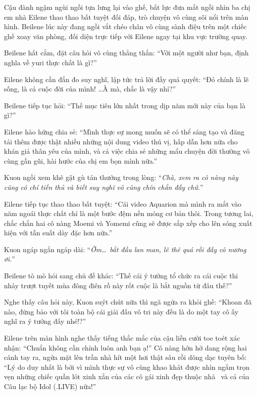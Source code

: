 \documentclass[../main.tex]{subfiles}
\begin{document}
Cậu đành ngậm ngùi ngồi tựa lưng lại vào ghế, bất lực đưa mắt ngồi nhìn ba chị em nhà Eilene thao thao bất tuyệt đối đáp, trò chuyện vô cùng sôi nổi trên màn hình. Beilene lúc này đang ngồi vắt chéo chân vô cùng sành điệu trên một chiếc ghế xoay văn phòng, đối diện trực tiếp với Eilene ngay tại khu vực trường quay.

Beilene hất cằm, đặt câu hỏi vô cùng thẳng thắn: ``Với một người như bạn, định nghĩa về yuri thực chất là gì?''

Eilene không cần đắn đo suy nghĩ, lập tức trả lời đầy quả quyết: ``Đó chính là lẽ sống, là cả cuộc đời của mình! \dots À mà, chắc là vậy nhỉ?''

Beilene tiếp tục hỏi: ``Thế mục tiêu lớn nhất trong dịp năm mới này của bạn là gì?''

Eilene hào hứng chia sẻ: ``Mình thực sự mong muốn sẽ có thể sáng tạo và đăng tải thêm được thật nhiều những nội dung video thú vị, hấp dẫn hơn nữa cho khán giả thân yêu của mình, và cả việc chia sẻ những mẩu chuyện đời thường vô cùng gần gũi, hài hước của chị em bọn mình nữa.''

Kuon ngồi xem khẽ gật gù tán thưởng trong lòng: ``\textit{Chà, xem ra cô nàng này cũng có chí tiến thủ và biết suy nghĩ vô cùng chín chắn đấy chứ.}''

Eilene tiếp tục thao thao bất tuyệt: ``Cái video Aquarion mà mình ra mắt vào năm ngoái thực chất chỉ là một bước đệm nền móng cơ bản thôi. Trong tương lai, chắc chắn hai cô nàng Moemi và Yomemi cũng sẽ được sắp xếp cho lên sóng xuất hiện với tần suất dày đặc hơn nữa.''

Kuon ngáp ngắn ngáp dài: ``\textit{Ờm\dots\ bắt đầu lan man, lê thê quá rồi đấy cô nương ơi.}''

Beilene tò mò hỏi sang chủ đề khác: ``Thế cái ý tưởng tổ chức ra cái cuộc thi nhảy trượt tuyết mùa đông điên rồ này rốt cuộc là bắt nguồn từ đâu thế?''

Nghe thấy câu hỏi này, Kuon suýt chút nữa thì ngã ngửa ra khỏi ghế: ``Khoan đã nào, đừng bảo với tôi toàn bộ cái giải đấu vô tri này đều là do một tay cô ấy nghĩ ra ý tưởng đấy nhé!?''

Eilene trên màn hình nghe thấy tiếng thắc mắc của cậu liền cười toe toét xác nhận: ``Chuẩn không cần chỉnh luôn anh bạn ạ!'' Cô nàng hớn hở dang rộng hai cánh tay ra, ngửa mặt lên trần nhà hít một hơi thật sâu rồi dõng dạc tuyên bố: ``Lý do duy nhất là bởi vì mình thực sự vô cùng khao khát được nhìn ngắm trọn vẹn những chiếc quần lót xinh xắn của các cô gái xinh đẹp thuộc nhà \hll\ và cả của Câu lạc bộ Idol (.LIVE) nữa!''
\end{document}
